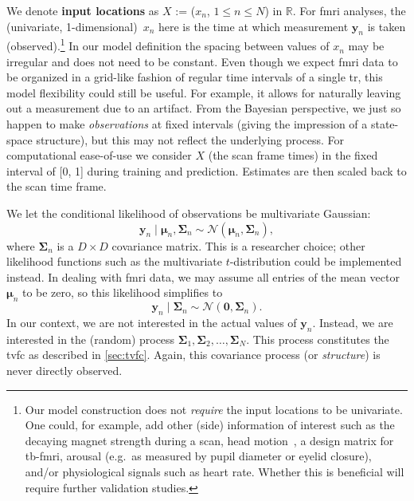 We denote \textbf{input locations} as $X$ := ($x_n$, $1 \leq n \leq N$) in $\mathbb{R}$.
For \gls{fmri} analyses, the (univariate, 1-dimensional)~$x_n$ here is the time at which measurement $\mathbf{y}_n$ is taken (observed).\footnote{Our model construction does not \emph{require} the input locations to be univariate. One could, for example, add other (side) information of interest such as the decaying magnet strength during a scan, head motion~\parencite[often considered one of the most significant confounding factors, see e.g.][]{Laumann2017}, a design matrix for \gls{tb-fmri}, arousal (e.g.~as measured by pupil diameter or eyelid closure), and/or physiological signals such as heart rate. Whether this is beneficial will require further validation studies.}
In our model definition the spacing between values of $x_n$ may be irregular and does not need to be constant.
Even though we expect \gls{fmri} data to be organized in a grid-like fashion of regular time intervals of a single \gls{tr}, this model flexibility could still be useful.
For example, it allows for naturally leaving out a measurement due to an artifact.
From the Bayesian perspective, we just so happen to make \emph{observations} at fixed intervals (giving the impression of a state-space structure), but this may not reflect the underlying process.
For computational ease-of-use we consider $X$ (the scan frame times) in the fixed interval of [0, 1] during training and prediction.
Estimates are then scaled back to the scan time frame.

We let the conditional likelihood of observations be multivariate Gaussian:
\begin{equation}
  \mathbf{y}_n \mid \boldsymbol{\mu}_n, \mathbf{\Sigma}_n \sim \mathcal{N}(\boldsymbol{\mu}_n, \mathbf{\Sigma}_n),
\end{equation}
where $\mathbf{\Sigma}_n$ is a $D \times D$ covariance matrix.
This is a researcher choice; other likelihood functions such as the multivariate $t$-distribution could be implemented instead.
In dealing with \gls{fmri} data, we may assume all entries of the mean vector~$\boldsymbol{\mu}_n$ to be zero, so this likelihood simplifies to
\begin{equation}
  \mathbf{y}_n \mid \mathbf{\Sigma}_n \sim \mathcal{N}(\textbf{0}, \mathbf{\Sigma}_n).
\end{equation}
In our context, we are not interested in the actual values of $\mathbf{y}_n$.
Instead, we are interested in the (random) process $\mathbf{\Sigma}_1, \mathbf{\Sigma}_2, \dots, \mathbf{\Sigma}_N$.
This process constitutes the \gls{tvfc} as described in \cref{sec:tvfc}.
Again, this covariance process (or \emph{structure}) is never directly observed.


